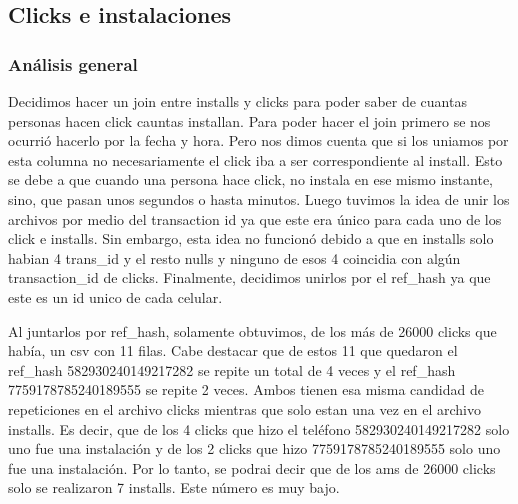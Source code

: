 \documentclass[a4paper, 12pt]{article}
\begin{document}
\subsection{Clicks e instalaciones}
	\subsubsection{Análisis general}
	Decidimos hacer un join entre installs y clicks para poder saber de cuantas personas hacen click cauntas installan. Para poder hacer el join primero se nos ocurrió hacerlo por la fecha y hora. Pero nos dimos cuenta que si los uniamos por esta columna no necesariamente el click iba a ser correspondiente al install. Esto se debe a que cuando una persona hace click, no instala en ese mismo instante, sino, que pasan unos segundos o hasta minutos. Luego tuvimos la idea de unir los archivos por medio del transaction id ya que este era único para cada uno de los click e installs. Sin embargo, esta idea no funcionó debido a que en installs solo habian 4 trans\_id y el resto nulls y ninguno de esos 4 coincidia con algún transaction\_id de clicks. Finalmente, decidimos unirlos por el ref\_hash ya que este es un id unico de cada celular.
	
	Al juntarlos por ref\_hash, solamente obtuvimos, de los más de 26000 clicks que había, un csv con 11 filas. Cabe destacar que de estos 11 que quedaron el ref\_hash 582930240149217282 se repite un total de 4 veces y el ref\_hash 7759178785240189555 se repite 2 veces. Ambos tienen esa misma candidad de repeticiones en el archivo clicks mientras que solo estan una vez en el archivo installs. Es decir, que de los 4 clicks que hizo el teléfono 582930240149217282 solo uno fue una instalación y de los 2 clicks que hizo 7759178785240189555 solo uno fue una instalación. Por lo tanto, se podrai decir que de los ams de 26000 clicks solo se realizaron 7 installs. Este número es muy bajo.
	
\end{document}
